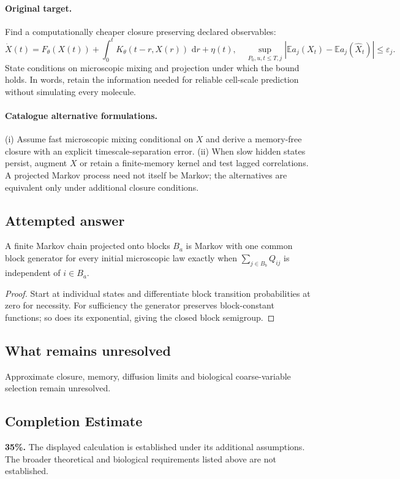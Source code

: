 \documentclass[11pt]{article}
\begin{document}
\paragraph{Original target.}
Find a computationally cheaper closure preserving declared observables:
\[
\dot X(t)=F_\theta(X(t))+\int_0^tK_\theta(t-r,X(r))\,\,\mathrm{d} r+\eta(t),
\quad\sup_{P_0,u,t\leq T,j}|\mathbb{E} a_j(X_t)-\mathbb{E} a_j(\widehat X_t)|\leq\varepsilon_j.
\]
State conditions on microscopic mixing and projection under which the bound holds. In words, retain the information needed for reliable cell-scale prediction without simulating every molecule.
\paragraph{Catalogue alternative formulations.}
(i) Assume fast microscopic mixing conditional on $X$ and derive a memory-free closure with an explicit timescale-separation error. (ii) When slow hidden states persist, augment $X$ or retain a finite-memory kernel and test lagged correlations. A projected Markov process need not itself be Markov; the alternatives are equivalent only under additional closure conditions.
\subsection{Attempted answer}
\begin{proposition}
A finite Markov chain projected onto blocks $B_a$ is Markov with one common block generator for every initial microscopic law exactly when $\sum_{j\in B_b}Q_{ij}$ is independent of $i\in B_a$.
\end{proposition}
\begin{proof}
Start at individual states and differentiate block transition probabilities at zero for necessity. For sufficiency the generator preserves block-constant functions; so does its exponential, giving the closed block semigroup.
\end{proof}
\subsection{What remains unresolved}
Approximate closure, memory, diffusion limits and biological coarse-variable selection remain unresolved.
\subsection{Completion Estimate}
\textbf{35\%.} The displayed calculation is established under its additional assumptions. The broader theoretical and biological requirements listed above are not established.
\end{document}
